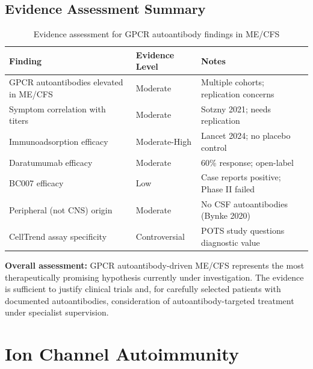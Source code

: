 \subsection{Evidence Assessment Summary}

\begin{table}[htbp]
\centering
\small
\begin{tabular}{p{4cm}p{2.5cm}p{6cm}}
\toprule
\textbf{Finding} & \textbf{Evidence Level} & \textbf{Notes} \\
\midrule
GPCR autoantibodies elevated in ME/CFS & Moderate & Multiple cohorts; replication concerns \\
Symptom correlation with titers & Moderate & Sotzny 2021; needs replication \\
Immunoadsorption efficacy & Moderate-High & Lancet 2024; no placebo control \\
Daratumumab efficacy & Moderate & 60\% response; open-label \\
BC007 efficacy & Low & Case reports positive; Phase II failed \\
Peripheral (not CNS) origin & Moderate & No CSF autoantibodies (Bynke 2020) \\
CellTrend assay specificity & Controversial & POTS study questions diagnostic value \\
\bottomrule
\end{tabular}
\caption{Evidence assessment for GPCR autoantibody findings in ME/CFS}
\end{table}

\textbf{Overall assessment:} GPCR autoantibody-driven ME/CFS represents the most therapeutically promising hypothesis currently under investigation. The evidence is sufficient to justify clinical trials and, for carefully selected patients with documented autoantibodies, consideration of autoantibody-targeted treatment under specialist supervision.


\section{Ion Channel Autoimmunity}
\label{sec:ion-channel}

